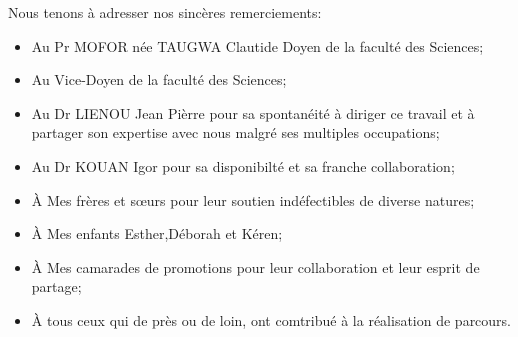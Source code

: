 Nous tenons à adresser nos sincères remerciements:
\begin{itemize}
\item Au Pr MOFOR née TAUGWA Clautide Doyen de la faculté des Sciences;
\item Au  Vice-Doyen de la faculté des Sciences;
\item Au Dr LIENOU Jean Pièrre pour sa spontanéité à diriger ce travail et à partager son expertise avec nous malgré ses multiples occupations;
\item Au Dr KOUAN Igor pour sa disponibilté  et sa franche collaboration;
\item \`{A} Mes frères et sœurs pour leur soutien indéfectibles de diverse natures;
\item \`{A} Mes enfants Esther,Déborah et Kéren;
\item \`{A} Mes camarades de promotions pour leur collaboration et leur esprit de partage;
\item \`{A} tous ceux qui de près ou de loin, ont comtribué à la réalisation de parcours.
\end{itemize}

\myCleanStarChapterEnd
